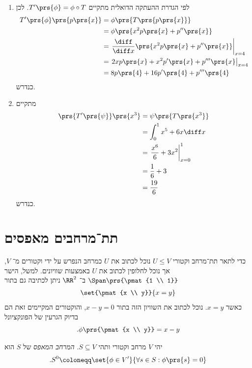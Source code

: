 \documentclass[a4paper,10pt,twoside,openany]{book}
\begin{document}
\begin{solution}
\begin{enumerate}
\item לפי הגדרת ההעתקה הדואלית מתקיים
$T'\prs{\phi} = \phi \circ T$.
לכן
\begin{align*}
T'\prs{\phi}\prs{p\prs{x}} &= \phi \prs{T\prs{p\prs{x}}}
\\&=
\phi\prs{x^2 p\prs{x} + p''\prs{x}}
\\&= \left. \frac{\diff}{\diff x} \prs{x^2 p\prs{x} + p''\prs{x}} \right|_{x=4}
\\&= \left. 2x p\prs{x} + x^2 p'\prs{x} + p'''\prs{x} \right|_{x=4}
\\&= 8 p\prs{4} + 16 p'\prs{4} + p'''\prs{4}
\end{align*}
כנדרש.

\item מתקיים
\begin{align*}
\prs{T'\prs{\psi}}\prs{x^3} &= \psi\prs{T\prs{x^3}}
\\&= \int_0^1 x^5 + 6x \diff x
\\&= \left. \frac{x^6}{6} + 3x^2 \right|_{x=0}^1
\\&= \frac{1}{6} + 3
\\&= \frac{19}{6}
\end{align*}
כנדרש.
\end{enumerate}
\end{solution}

\section{תת־מרחבים מאפסים}

כדי לתאר תת־מרחב וקטורי
$U \leq V$
נוכל לכתוב את
$U$
כמרחב הנפרש על ידי וקטורים מ־%
$V$,
אך נוכל לחלופין לכתוב את
$U$
באמצעות שוויונים. למשל, הישר
$\Span\prs{\pmat{1 \\ 1}}$
ב־%
$\RR^2$
ניתן לכתיבה גם בתור
\begin{align*}
\set{\pmat{x \\ y}}{x = y}
\end{align*}
כאשר
$x=y$.
נוכל לכתוב את השוויון הזה בתור
$x-y = 0$,
והוקטורים המקיימים זאת הם בדיוק הגרעין של הפונקציונל
\[\text{.} \phi\prs{\pmat{x \\ y}} = x-y\]

\begin{definition}
יהי
$V$
מרחב וקטורי ותהי
$S \subseteq V$.
\emph{המרחב המאפס}
של
$S$
הוא
\begin{align*}
\text{.} S^0 \coloneqq \set{\phi \in V'}{\forall s \in S: \phi\prs{s} = 0}
\end{align*}
\end{definition}
\end{document}
